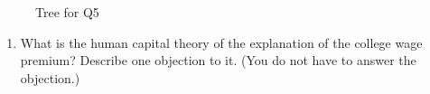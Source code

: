 \documentclass[
  12pt,
  letterpaper,
  DIV=11,
  numbers=noendperiod]{scrartcl}
\providecommand{\tightlist}{%
  \setlength{\itemsep}{0pt}\setlength{\parskip}{0pt}}\usepackage{longtable,booktabs,array}
\begin{document}
\begin{figure}


\caption{\label{fig-back}Tree for Q5}

\end{figure}%

\begin{enumerate}
\def\labelenumi{\arabic{enumi}.}
\setcounter{enumi}{5}
\tightlist
\item
  What is the human capital theory of the explanation of the college
  wage premium? Describe one objection to it. (You do not have to answer
  the objection.)
\end{enumerate}
\end{document}
